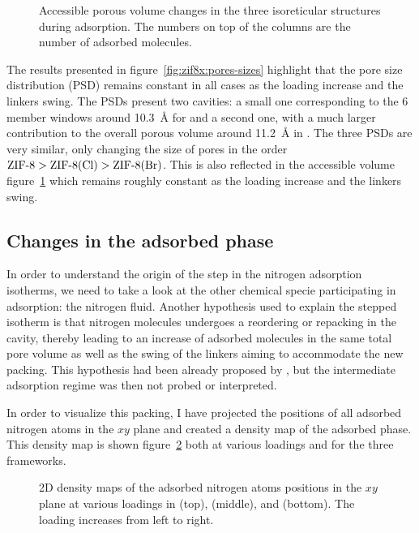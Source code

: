 \documentclass[thesis]{subfiles}
\begin{document}
\begin{figure}[ht]
    \centering
    
    \caption{Accessible porous volume changes in the three isoreticular
    structures during adsorption. The numbers on top of the columns are the
    number of adsorbed  molecules.}
    \label{fig:zif8x:porous-volume}
\end{figure}

The results presented in figure~\ref{fig:zif8x:pores-sizes} highlight that the
pore size distribution (PSD) remains constant in all cases as the loading
increase and the linkers swing. The PSDs present two cavities: a small one
corresponding to the 6 member windows around \SI{10.3}{\AA} for  and a
second one, with a much larger contribution to the overall porous volume around
\SI{11.2}{\AA} in . The three PSDs are very similar, only changing the size
of pores in the order $\text{\ZIF8} > \text{\ZIFCl} > \text{\ZIFBr}$. This is
also reflected in the accessible volume figure~\ref{fig:zif8x:porous-volume}
which remains roughly constant as the loading increase and the linkers swing.

\subsection{Changes in the adsorbed phase}

In order to understand the origin of the step in the nitrogen adsorption
isotherms, we need to take a look at the other chemical specie participating in
adsorption: the nitrogen fluid. Another hypothesis used to explain the stepped
isotherm is that nitrogen molecules undergoes a reordering or repacking in the
cavity, thereby leading to an increase of adsorbed molecules in the same total
pore volume as well as the swing of the linkers aiming to accommodate the new
packing. This hypothesis had been already proposed by
\citeauthor{Ania2012}\cite{Ania2012}, but the intermediate adsorption regime was
then not probed or interpreted.

In order to visualize this packing, I have projected the positions of all
adsorbed nitrogen atoms in the $xy$ plane and created a density map of the
adsorbed phase. This density map is shown figure~\ref{fig:zif8x:density} both at
various loadings and for the three frameworks.

\begin{figure}[ht]
    \centering
    
    \caption{2D density maps of the adsorbed nitrogen atoms positions in the $xy$
    plane at various loadings in  (top), \ZIFCl (middle), and \ZIFBr
    (bottom). The loading increases from left to right.}
    \label{fig:zif8x:density}
\end{figure}
\end{document}
